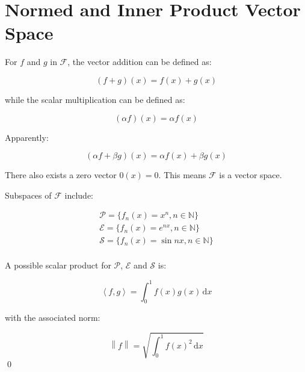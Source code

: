 \documentclass[12pt]{article}
\begin{document}



\pagebreak
\section*{Normed and Inner Product Vector Space}



For $f$ and $g$ in $\mathcal{F}$, the vector addition can be defined as:

\begin{equation}
    (f + g)(x) = f(x) + g(x)
\end{equation}

while the scalar multiplication can be defined as:

\begin{equation}
    (\alpha f)(x) = \alpha f(x)
\end{equation}

Apparently:

\begin{equation}
    (\alpha f + \beta g)(x) = \alpha f(x) + \beta g(x)
\end{equation}

There also exists a zero vector $0(x) = 0$. This means $\mathcal{F}$ is a vector space.


Subspaces of $\mathcal{F}$ include:

\begin{equation}
\begin{split}
    \mathcal{P} = \{f_{n}(x) = x^n, n \in \mathbb{N}\} \\
    \mathcal{E} = \{f_{n}(x) = e^{nx}, n \in \mathbb{N}\} \\
    \mathcal{S} = \{f_{n}(x) = \sin{nx}, n \in \mathbb{N}\} \\
\end{split}
\end{equation}


A possible scalar product for $\mathcal{P}$, $\mathcal{E}$ and $\mathcal{S}$ is:

\begin{equation}
    \left\langle f, g \right\rangle = \int_{0}^{1} f(x) g(x) \, \mathrm{d}x
\end{equation}

with the associated norm:

\begin{equation}
    \left\lVert f \right\rVert = \sqrt{\int_{0}^{1} f(x)^{2} \, \mathrm{d}x}
\end{equation}
\qed
\end{document}

